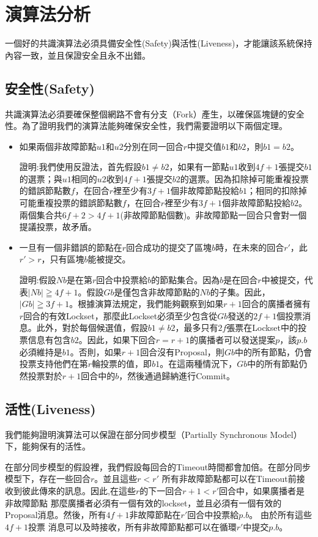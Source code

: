 \chapter{演算法分析}\label{se_4}
一個好的共識演算法必須具備安全性(Safety)與活性(Liveness)，才能讓該系統保持內容一致，並且保證安全且永不出錯。
\section{安全性(Safety)}\label{se_4} 
共識演算法必須要確保整個網路不會有分支（Fork）產生，以確保區塊鏈的安全性。為了證明我們的演算法能夠確保安全性，我們需要證明以下兩個定理。
\begin{itemize}%
\item 如果兩個非故障節點$u1$和$u2$分別在同一回合$r$中提交值$b1$和$b2$，則$b1 = b2$。

證明:我們使用反證法，首先假設$b1 \ne b2$，如果有一節點$u1$收到$4f+1$張提交$b1$的選票；與$u1$相同的$u2$收到$4f+1$張提交$b2$的選票。因為扣除掉可能重複投票的錯誤節點數$f$，在回合$r$裡至少有$3f+1$個非故障節點投給$b1$；相同的扣除掉可能重複投票的錯誤節點數$f$，在回合$r$裡至少有$3f+1$個非故障節點投給$b2$。兩個集合共$6f+2 > 4f+1$(非故障節點個數)。非故障節點一回合只會對一個提議投票，故矛盾。

\item 一旦有一個非錯誤的節點在$r$回合成功的提交了區塊$b$時，在未來的回合$r'$，此$r'>r$，只有區塊$b$能被提交。

證明:假設$Nb$是在第$r$回合中投票給$b$的節點集合。因為$b$是在回合$r$中被提交，代表$|Nb| \geqq 4f+1$。假設$Gb$是僅包含非故障節點的$Nb$的子集。因此，$|Gb| \geqq 3f+1$。根據演算法規定，我們能夠觀察到如果$r + 1$回合的廣播者擁有$r$回合的有效Lockset，那麼此Lockset必須至少包含從$Gb$發送的$2f + 1$個投票消息。此外，對於每個候選值，假設$b1 \ne b2$，最多只有$2f$張票在Lockset中的投票信息有包含$b2$。因此，如果下回合$r=r+1$的廣播者可以發送提案$p$，該$p.b$必須維持是$b1$。否則，如果$r+ 1$回合沒有Proposal，則$Gb$中的所有節點，仍會投票支持他們在第$r$輪投票的值，即$b1$。在這兩種情況下，$Gb$中的所有節點仍然投票對於$r+ 1$回合中的$b$，然後通過歸納進行Commit。
\end{itemize}

\section{活性(Liveness)}\label{se_4} 
我們能夠證明演算法可以保證在部分同步模型（Partially Synchronous Model）下，能夠保有的活性。

在部分同步模型的假設裡，我們假設每回合的Timeout時間都會加倍。在部分同步模型下，存在一些回合$r$。並且這些$r<r'$
所有非故障節點都可以在Timeout前接收到彼此傳來的訊息。因此,在這些$r$的下一回合$r + 1<r'$回合中，如果廣播者是非故障節點
那麼廣播者必須有一個有效的lockset，並且必須有一個有效的Proposal消息。然後，所有$4f +1$非故障節點在$r'$回合中投票給$p.b$。 由於所有這些$4f +1$投票
消息可以及時接收，所有非故障節點都可以在循環$r'$中提交$p.b$。